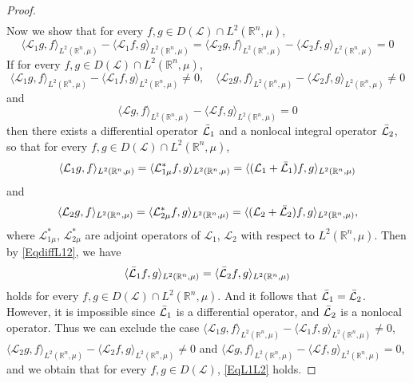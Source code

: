 \documentclass[10pt,a4paper]{amsart}
\begin{document}
\begin{proof}
\begin{align*}
\end{align*}
Now we show that for every $f,g \in D(\mathcal{L}) \cap L^2(\mathbb{R}^n, \mu)$,
\begin{equation}\label{EqL1L2}
    \langle \mathcal{L}_{1}g,f\rangle_{L^2(\mathbb{R}^n, \mu)} - \langle \mathcal{L}_{1}f,g\rangle_{L^2(\mathbb{R}^n, \mu)} = \langle \mathcal{L}_{2}g,f\rangle_{L^2(\mathbb{R}^n, \mu)} - \langle \mathcal{L}_{2}f,g\rangle_{L^2(\mathbb{R}^n, \mu)}  = 0
\end{equation}
If for every $f,g\in D(\mathcal{L}) \cap L^2(\mathbb{R}^n, \mu)$, 
\begin{equation*}
    \langle \mathcal{L}_{1}g,f\rangle_{L^2(\mathbb{R}^n, \mu)} - \langle \mathcal{L}_{1}f,g\rangle_{L^2(\mathbb{R}^n, \mu)} \neq 0, \quad \langle \mathcal{L}_{2}g,f\rangle_{L^2(\mathbb{R}^n, \mu)} - \langle \mathcal{L}_{2}f,g\rangle_{L^2(\mathbb{R}^n, \mu)} \neq 0
\end{equation*}
and 
\begin{equation}\label{EqdiffL12}
    \langle \mathcal{L}g,f\rangle_{L^2(\mathbb{R}^n, \mu)} - \langle \mathcal{L}f,g\rangle_{L^2(\mathbb{R}^n, \mu)} = 0
\end{equation}
then there exists a differential operator $\Bar{\mathcal{L}}_1$ and a nonlocal integral operator $\Bar{\mathcal{L}}_2$, so that for every $f,g\in D(\mathcal{L}) \cap L^2(\mathbb{R}^n, \mu)$,
\begin{equation*}
    \langle \mathcal{L}_{1}g,f\rangle_{L^2(\mathbb{R}^n, \mu)} = \langle \mathcal{L}^{\ast}_{1\mu}f,g\rangle_{L^2(\mathbb{R}^n, \mu)} = \langle (\mathcal{L}_{1} + \Bar{\mathcal{L}}_1)f,g\rangle_{L^2(\mathbb{R}^n, \mu)}
\end{equation*}
and 
\begin{equation*}
    \langle \mathcal{L}_{2}g,f\rangle_{L^2(\mathbb{R}^n, \mu)} = \langle \mathcal{L}^{\ast}_{2\mu}f,g\rangle_{L^2(\mathbb{R}^n, \mu)} = \langle (\mathcal{L}_{2} + \Bar{\mathcal{L}}_2)f,g\rangle_{L^2(\mathbb{R}^n, \mu)},
\end{equation*}
where $\mathcal{L}^{\ast}_{1\mu}$, $\mathcal{L}^{\ast}_{2\mu}$ are adjoint operators of $\mathcal{L}_1$, $\mathcal{L}_2$ with
respect to $L^2(\mathbb{R}^n, \mu)$.
Then by \eqref{EqdiffL12}, we have
\begin{equation*}
    \langle \Bar{\mathcal{L}}_1 f,g\rangle_{L^2(\mathbb{R}^n, \mu)} = \langle \Bar{\mathcal{L}}_2f,g\rangle_{L^2(\mathbb{R}^n, \mu)}
\end{equation*}
holds for every $f,g\in D(\mathcal{L}) \cap L^2(\mathbb{R}^n, \mu)$.
And it follows that $\Bar{\mathcal{L}}_1 = \Bar{\mathcal{L}}_2$.
However, it is impossible since $\Bar{\mathcal{L}}_1$ is a differential operator, and $\Bar{\mathcal{L}}_2$ is a nonlocal operator.
Thus we can exclude the case $\langle \mathcal{L}_{1}g,f\rangle_{L^2(\mathbb{R}^n, \mu)} - \langle \mathcal{L}_{1}f,g\rangle_{L^2(\mathbb{R}^n, \mu)} \neq 0$,  $\langle \mathcal{L}_{2}g,f\rangle_{L^2(\mathbb{R}^n, \mu)} - \langle \mathcal{L}_{2}f,g\rangle_{L^2(\mathbb{R}^n, \mu)} \neq 0$ and $\langle \mathcal{L}g,f\rangle_{L^2(\mathbb{R}^n, \mu)} - \langle \mathcal{L}f,g\rangle_{L^2(\mathbb{R}^n, \mu)} = 0$, and we obtain that for every $f,g \in D(\mathcal{L})$, \eqref{EqL1L2} holds. 


\end{proof}
\end{document}
